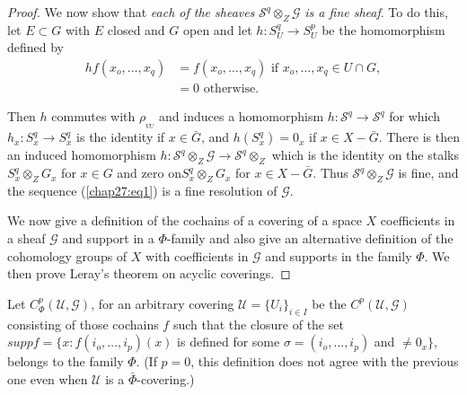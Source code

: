 \begin{proof}
We now show that \textit{each of the sheaves} $\mathscr{S}^q
\otimes_Z \mathscr{G}$ \textit{is a fine sheaf}. To do this, let $E
\subset G$ with $E$ closed and $G$ open and let $h:S^q_U \to S^p_U$ be
the homomorphism defined by  
\begin{align*}
h f(x_o, \ldots ,x_q) & = f(x_o, \ldots ,x_q) \text{ if } x_o, \ldots
,x_q \in U \cap G,\\ 
& = 0 \text{ otherwise.}
\end{align*}

Then $h$ commutes with $\rho_{_{VU}}$ and induces a homomorphism
$h:\mathscr{S}^q \to \mathscr{S}^q $ for which $h_x:S^q_x \to S^q_x$
is the identity if $x \in  \bar{G}$, and $h(S^q_x) = 0_x$ if $x \in X
- \bar{G}$. There is then an induced homomorphism $h:\mathscr{S}^q
\otimes_Z \mathscr{G}\to \mathscr{S}^q \otimes_Z$ which is the
identity on the stalks $S^q_x 
\otimes_Z G_x $ for $x \in G$ and zero on\pageoriginale $S^q_x
\otimes_Z G_x$ for 
$x \in X - \bar{G}$. Thus $\mathscr{S}^q \otimes_Z \mathscr{G}$ is
fine, and the sequence (\ref{chap27:eq1}) is a fine resolution of
$\mathscr{G}$.  

We now give a definition of the cochains of a covering of a space $X$
coefficients in a sheaf $\mathscr{G}$ and support in a $\Phi$-family
and also give an alternative definition of the cohomology groups of
$X$ with coefficients in $\mathscr{G}$ and supports in the family
$\Phi$. We then prove Leray's theorem on acyclic coverings.  
\end{proof}

\begin{defi*}
Let $C^p_\Phi(\mathscr{U},\mathscr{G})$, for an arbitrary covering
$\mathscr{U}=\{ U_i \}_{i \in I}$ be the
$C^p(\mathscr{U},\mathscr{G})$ consisting  of those cochains $f$ such
that the closure of the set $supp f=\{ x:f(i_o, \ldots ,i_p)(x)$ is
defined for some $\sigma=(i_o, \ldots ,i_p)$ and $\neq 0_x \}$,
belongs to the family $\Phi$. (If $p=0$, this definition does not
agree with the previous one even when $\mathscr{U}$ is a
$\bar{\Phi}$-covering.) 
\end{defi*}

